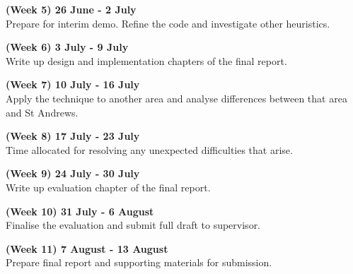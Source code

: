 \documentclass[12pt,a4paper]{report}
\begin{document}
\textbf{(Week 5) 26 June - 2 July}\\
Prepare for interim demo. Refine the code and investigate other heuristics.

\textbf{(Week 6) 3 July - 9 July}\\
Write up design and implementation chapters of the final report.

\textbf{(Week 7) 10 July - 16 July}\\
Apply the technique to another area and analyse differences between that area and St Andrews.

\textbf{(Week 8) 17 July - 23 July}\\
Time allocated for resolving any unexpected difficulties that arise.

\textbf{(Week 9) 24 July - 30 July}\\
Write up evaluation chapter of the final report.

\textbf{(Week 10) 31 July - 6 August}\\
Finalise the evaluation and submit full draft to supervisor.

\textbf{(Week 11) 7 August - 13 August}\\
Prepare final report and supporting materials for submission.
\end{document}
